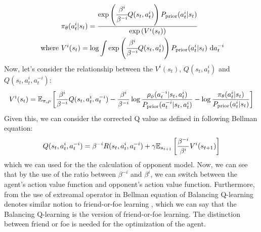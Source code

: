 \begin{equation}
\begin{aligned}
\label{eqn:chap3-prob-agent}
    &\pi_\theta(a^{i}_t | s_t) = \frac{\exp \left(  \cfrac{\beta^{i}}{\beta^{-i}} Q(s_t, a^{i}_t) \right) P_{\text{prior}}(a^{i}_t | s_t)}{\exp\left( V^{i}(s_t) \right)} \\
    \text{ where }& V^{i}(s_t) = \log \int \exp \left(  \cfrac{\beta^{i}}{\beta^{-i}} Q(s_t, a^{i}_t) \right) P_{\text{prior}}(a^{i}_t | s_t) \ \mathrm{d} a^{-i}_t
\end{aligned}
\end{equation}
Now, let's consider the relationship between the $V^{i}(s_t)$, $Q(s_t, a_t^{i})$ and $Q(s_t, a^i_t, a^{-i}_t)$:
\begin{equation}
\label{eqn:chap3-prob-balance-val}
    V^{i}(s_t) = \mathbb{E}_{\pi, \rho}\left[ \frac{\beta^{i}}{\beta^{-i}} Q(s_t, a^i_t, a^{-i}_t) - \frac{\beta^{i}}{\beta^{-i}}\log\frac{\rho_\phi(a^{-i}_t | s_t, a^i_t)}{P_{\text{prior}}( a^{-i}_t| s_t, a^i_t)} - \log \frac{\pi_\theta(a^{i}_t | s_t)}{P_{\text{prior}}(a^{i}_t | s_t)} \right]
\end{equation}
Given this, we can consider the corrected Q value as defined in following Bellman equation:
\begin{equation}
    Q(s_t, a^i_t, a^{-i}_t) = \beta^{-i} R(s_t, a^i_t, a^{-i}_t) + \gamma \mathbb{E}_{s_{t+1}}\left[ \frac{\beta^{-i}}{\beta^i}V^{i}(s_{t+1}) \right]    
\end{equation}
which we can used for the the calculation of opponent model. Now, we can see that by the use of the ratio between $\beta^{-i}$ and $\beta^{i}$, we can switch between the agent's action value function and opponent's action value function. Furthermore, from the use of extreamal operator in Bellman equation \cite{grau2018balancing} of Balancing Q-learning denotes similar notion to friend-or-foe learning \cite{littman2001friend}, which we can say that the Balancing Q-learning is the  version of friend-or-foe learning. The distinction between friend or foe is needed for the optimization of the agent.

